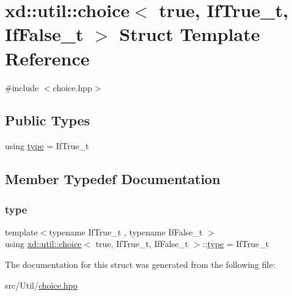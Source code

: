 \hypertarget{structxd_1_1util_1_1choice_3_01true_00_01_if_true__t_00_01_if_false__t_01_4}{}\section{xd\+:\+:util\+:\+:choice$<$ true, If\+True\+\_\+t, If\+False\+\_\+t $>$ Struct Template Reference}
\label{structxd_1_1util_1_1choice_3_01true_00_01_if_true__t_00_01_if_false__t_01_4}


{\ttfamily \#include $<$choice.\+hpp$>$}

\subsection*{Public Types}
\begin{DoxyCompactItemize}
\item 
using \mbox{\hyperlink{structxd_1_1util_1_1choice_3_01true_00_01_if_true__t_00_01_if_false__t_01_4_af9e6fa0a2a3bc6f6baa26fe6328d7ba2}{type}} = If\+True\+\_\+t
\end{DoxyCompactItemize}


\subsection{Member Typedef Documentation}
\mbox{\label{structxd_1_1util_1_1choice_3_01true_00_01_if_true__t_00_01_if_false__t_01_4_af9e6fa0a2a3bc6f6baa26fe6328d7ba2}} 
\subsubsection{\texorpdfstring{type}{type}}
{\footnotesize\ttfamily template$<$typename If\+True\+\_\+t , typename If\+False\+\_\+t $>$ \\
using \mbox{\hyperlink{structxd_1_1util_1_1choice}{xd\+::util\+::choice}}$<$ true, If\+True\+\_\+t, If\+False\+\_\+t $>$\+::\mbox{\hyperlink{structxd_1_1util_1_1choice_3_01true_00_01_if_true__t_00_01_if_false__t_01_4_af9e6fa0a2a3bc6f6baa26fe6328d7ba2}{type}} =  If\+True\+\_\+t}



The documentation for this struct was generated from the following file\+:\begin{DoxyCompactItemize}
\item 
src/\+Util/\mbox{\hyperlink{choice_8hpp}{choice.\+hpp}}\end{DoxyCompactItemize}
